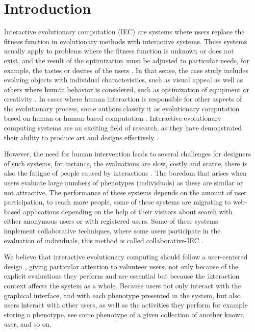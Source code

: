 \chapter{Introduction} \label{introduction}


\par Interactive evolutionary computation (IEC) are systems where users replace
the fitness function in evolutionary methods with interactive systems. These
systems usually apply to problems where the fitness function is unknown or does
not exist, and the result of the optimization must be adjusted to particular
needs, for example, the tastes or desires of the users \cite{}. In that sense,
the case study includes evolving objects with individual characteristics, such
as visual appeal as well as others where human behavior is considered, such as
optimization of equipment \cite{} or creativity \cite{}. In cases where human
interaction is   responsible for other aspects of the evolutionary process, some
authors classify it as evolutionary computation based on human \cite{} or human-based
computation \cite{}. Interactive evolutionary computing systems are an exciting field
of research, as they have demonstrated their ability to produce art and designs
effectively \cite{}.

\par However, the need for human intervention leads to several challenges for
designers of such systems, for instance, the evaluations are slow, costly and
scarce, there is also the fatigue of people caused by interactions \cite{}. The
boredom that arises when users evaluate large numbers of phenotypes
(individuals) as these are similar or not attractive. The performance of these
systems depends on the amount of user participation, to reach more people, some
of these systems are migrating to web-based applications depending on the help
of their visitors about search with either anonymous users or with registered
users. Some of these systems implement collaborative techniques, where some
users participate in the evaluation of individuals, this method is called
collaborative-IEC \cite{}.

\par We believe that interactive evolutionary computing should follow a user-centered
design \cite{}, giving particular attention to volunteer users, not only because of
the explicit evaluations they perform and are essential but because the
interaction context affects the system as a whole. Because users not only
interact with the graphical interface, and with each phenotype presented in the
system, but also users interact with other users, as well as the activities they
perform for example storing a phenotype, see some phenotype of a given
collection of another known user, and so on.

